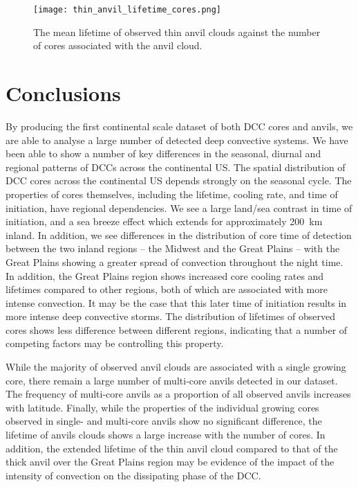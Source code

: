 \begin{figure}[t]
    \centering
    \texttt{[image: thin\_anvil\_lifetime\_cores.png]}
    \caption{The mean lifetime of observed thin anvil clouds against the number of cores associated with the anvil cloud.}
    \label{fig:thin_anvil_lifetime_by_core}
\end{figure}


\section{Conclusions}  %

By producing the first continental scale dataset of both DCC cores and anvils, we are able to analyse a large number of detected deep convective systems.
We have been able to show a number of key differences in the seasonal, diurnal and regional patterns of DCCs across the continental US.
The spatial distribution of DCC cores across the continental US depends strongly on the seasonal cycle.
The properties of cores themselves, including the lifetime, cooling rate, and time of initiation, have regional dependencies.
We see a large land/sea contrast in time of initiation, and a sea breeze effect which extends for approximately 200~\unit{km} inland.
In addition, we see differences in the distribution of core time of detection between the two inland regions -- the Midwest and the Great Plains -- with the Great Plains showing a greater spread of convection throughout the night time.
In addition, the Great Plains region shows increased core cooling rates and lifetimes compared to other regions, both of which are associated with more intense convection.
It may be the case that this later time of initiation results in more intense deep convective storms.
The distribution of lifetimes of observed cores shows less difference between different regions, indicating that a number of competing factors may be controlling this property.

While the majority of observed anvil clouds are associated with a single growing core, there remain a large number of multi-core anvils detected in our dataset.
The frequency of multi-core anvils as a proportion of all observed anvils increases with latitude.
Finally, while the properties of the individual growing cores observed in single- and multi-core anvils show no significant difference, the lifetime of anvils clouds shows a large increase with the number of cores.
In addition, the extended lifetime of the thin anvil cloud compared to that of the thick anvil over the Great Plains region may be evidence of the impact of the intensity of convection on the dissipating phase of the DCC.


